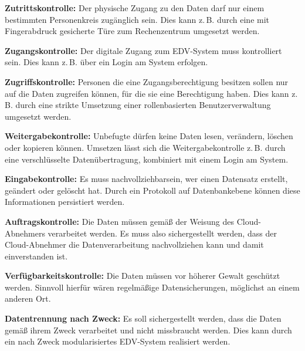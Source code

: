  \begin{seList}                            

\item \textbf{Zutrittskontrolle:}\newline
Der physische Zugang zu den Daten darf nur einem bestimmten Personenkreis zug\"anglich sein. Dies kann z.\,B. durch eine mit Fingerabdruck gesicherte T\"ure zum Rechenzentrum umgesetzt werden.
\item \textbf{Zugangskontrolle:}\newline
Der digitale Zugang zum EDV-System muss kontrolliert sein. Dies kann z.\,B. \"uber ein Login am System erfolgen.
\item \textbf{Zugriffskontrolle:}\newline
Personen die eine Zugangsberechtigung besitzen sollen nur auf die Daten zugreifen k\"onnen, f\"ur die sie eine Berechtigung haben. Dies kann z.\,B. durch eine strikte Umsetzung einer rollenbasierten Benutzerverwaltung umgesetzt werden.  
\item \textbf{Weitergabekontrolle:}\newline
Unbefugte d\"urfen keine Daten lesen, ver\"andern, l\"oschen oder kopieren k\"onnen. Umsetzen l\"asst sich die Weitergabekontrolle z.\,B. durch eine verschl\"usselte Daten\"ubertragung, kombiniert mit einem Login am System.
\item \textbf{Eingabekontrolle:}\newline
Es muss nachvollziehbarsein, wer einen Datensatz erstellt, ge\"andert oder gel\"oscht hat. Durch ein Protokoll auf Datenbankebene k\"onnen diese Informationen persistiert werden. 
\item \textbf{Auftragskontrolle:}\newline
Die Daten m\"ussen gem\"a{\ss} der Weisung des Cloud-Abnehmers verarbeitet werden. Es muss also sichergestellt werden, dass der Cloud-Abnehmer die Datenverarbeitung nachvollziehen kann und damit einverstanden ist.
\item \textbf{Verf\"ugbarkeitskontrolle:}\newline
Die Daten m\"ussen vor h\"oherer Gewalt gesch\"utzt werden. Sinnvoll hierf\"ur w\"aren regelm\"a{\ss}ige Datensicherungen, m\"oglichst an einem anderen Ort.
\item \textbf{Datentrennung nach Zweck:}\newline
Es soll sichergestellt werden, dass die Daten gem\"a{\ss} ihrem Zweck verarbeitet und nicht missbraucht werden. Dies kann durch ein nach Zweck modularisiertes  EDV-System realisiert werden.
\end{seList}

